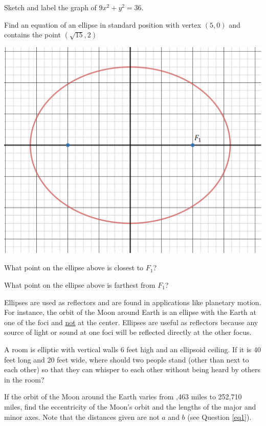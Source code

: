 \bq Sketch and label the graph of $9x^2+y^2=36$. \eq

\bq Find an equation of an ellipse in standard position with vertex $(5,0)$ and contains the point $(\sqrt{15},2)$ \eq

\bq\label{eq1} 

\begin{center} \includegraphics[scale=.4]{ellipse2.png} 

\end{center}
\be
\item What point on the ellipse above is closest to $F_1$?
\item What point on the ellipse above is farthest from $F_1$?
\ee
\eq
\begin{info} Ellipses are used as reflectors and are found in applications like planetary motion. For instance, the orbit of the Moon around Earth is an ellipse with the Earth at one of the foci and \underline{not} at the center. Ellipses are useful as reflectors because any source of light or sound at one foci will be reflected directly at the other focus. \end{info}

\bq A room is elliptic with vertical walls 6 feet high and an ellipsoid ceiling. If it is 40 feet long and 20 feet wide, where should two people stand (other than next to each other) so that  they can whisper to each other without being heard by others in the room?
\eq

\bq If the orbit of the Moon around the Earth varies from ,463 miles to 252,710 miles, find the eccentricity of the Moon's orbit and the lengths of the major and minor axes. Note that the distances given are not $a$ and $b$ (see Question \ref{eq1}).
\eq

